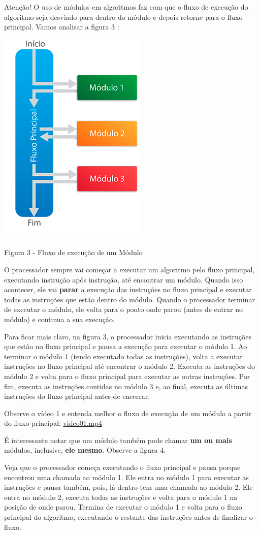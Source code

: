\documentclass[11pt]{article}
\begin{document}
Atenção! O uso de módulos em algoritmos faz com que o fluxo de execução do algoritmo seja desviado para dentro do módulo e depois retorne para o fluxo principal. Vamos analisar a figura 3 :

\begin{center}
\includegraphics[width=.3\linewidth]{figura03.png}


\caption{Figura 3 - Fluxo de execução de um Módulo}
\end{center}


O processador sempre vai começar a executar um algoritmo pelo fluxo principal, executando instrução após instrução, até encontrar um módulo. Quando isso acontecer, ele vai \textbf{parar} a execução das instruções no fluxo principal e executar todas as instruções que estão dentro do módulo. Quando o processador terminar de executar o módulo, ele volta para o ponto onde parou (antes de entrar no módulo) e continua a sua execução.

Para ficar mais claro, na figura 3, o processador inicia executando as instruções que estão no fluxo principal e pausa a execução para executar o módulo 1. Ao terminar o módulo 1 (tendo executado todas as instruções), volta a executar instruções no fluxo principal até encontrar o módulo 2. Executa as instruções do módulo 2 e volta para o fluxo principal para executar as outras instruções. Por fim, executa as instruções contidas no módulo 3 e, ao final, executa as últimas instruções do fluxo principal antes de encerrar.

Observe o vídeo 1 e entenda melhor o fluxo de execução de um módulo a partir do fluxo principal:
\url{video01.mp4}

É interessante notar que um módulo também pode chamar \textbf{um ou mais} módulos, inclusive, \textbf{ele mesmo}. Observe a figura 4.

Veja que o processador começa executando o fluxo principal e pausa porque encontrou uma chamada ao módulo 1. Ele entra no módulo 1 para executar as instruções e pausa também, pois, lá dentro tem uma chamada ao módulo 2. Ele entra no módulo 2, executa todas as instruções e volta para o módulo 1 na posição de onde parou. Termina de executar o módulo 1 e volta para o fluxo principal do algoritmo, executando o restante das instruções antes de finalizar o fluxo.
\end{document}
